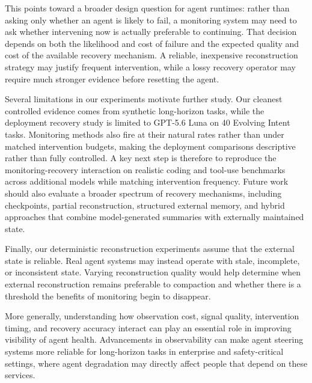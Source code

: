 \documentclass{article}
\begin{document}
This points toward a broader design question for agent runtimes: rather than asking only whether an agent is likely to fail, a monitoring system may need to ask whether intervening now is actually preferable to continuing. That decision depends on both the likelihood and cost of failure and the expected quality and cost of the available recovery mechanism. A reliable, inexpensive reconstruction strategy may justify frequent intervention, while a lossy recovery operator may require much stronger evidence before resetting the agent.

Several limitations in our experiments motivate further study. Our cleanest controlled evidence comes from synthetic long-horizon tasks, while the deployment recovery study is limited to GPT-5.6 Luna on 40 Evolving Intent tasks. Monitoring methods also fire at their natural rates rather than under matched intervention budgets, making the deployment comparisons descriptive rather than fully controlled. A key next step is therefore to reproduce the monitoring-recovery interaction on realistic coding and tool-use benchmarks across additional models while matching intervention frequency. Future work should also evaluate a broader spectrum of recovery mechanisms, including checkpoints, partial reconstruction, structured external memory, and hybrid approaches that combine model-generated summaries with externally maintained state.

Finally, our deterministic reconstruction experiments assume that the external state is reliable. Real agent systems may instead operate with stale, incomplete, or inconsistent state. Varying reconstruction quality would help determine when external reconstruction remains preferable to compaction and whether there is a threshold the benefits of monitoring begin to disappear.

More generally, understanding how observation cost, signal quality, intervention timing, and recovery accuracy interact can play an essential role in improving visibility of agent health. Advancements in observability can make agent steering systems more reliable for long-horizon tasks in enterprise and safety-critical settings, where agent degradation may directly affect people that depend on these services.

\clearpage


\end{document}
